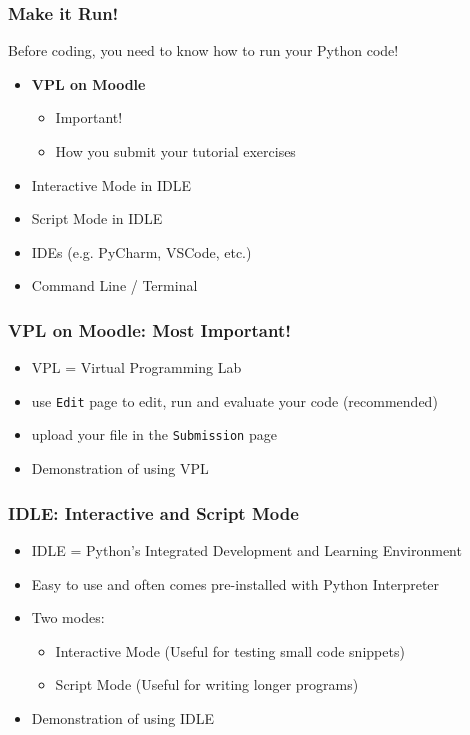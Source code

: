\documentclass{beamer}
\begin{document}
\begin{frame}
    \frametitle{Make it Run!}
    Before coding, you need to know how to run your Python code!
    \begin{itemize}
        \item \textbf{VPL on Moodle}
              \begin{itemize}
                  \item Important!
                  \item How you submit your tutorial exercises
              \end{itemize}
        \item Interactive Mode in IDLE
        \item Script Mode in IDLE
        \item IDEs (e.g. PyCharm, VSCode, etc.)
        \item Command Line / Terminal
    \end{itemize}
\end{frame}

\begin{frame}
    \frametitle{VPL on Moodle: Most Important!}
    \begin{itemize}
        \item VPL = Virtual Programming Lab
        \item use \texttt{Edit} page to edit, run and evaluate your code (recommended)
        \item upload your file in the \texttt{Submission} page
        \item Demonstration of using VPL
    \end{itemize}
\end{frame}

\begin{frame}
    \frametitle{IDLE: Interactive and Script Mode}
    \begin{itemize}
        \item IDLE = Python's Integrated Development and Learning Environment
        \item Easy to use and often comes pre-installed with Python Interpreter
        \item Two modes:
              \begin{itemize}
                  \item Interactive Mode (Useful for testing small code snippets)
                  \item Script Mode (Useful for writing longer programs)
              \end{itemize}
        \item Demonstration of using IDLE
    \end{itemize}
\end{frame}
\end{document}
